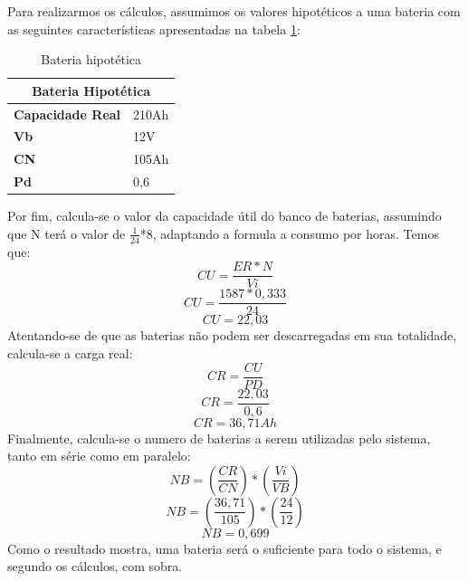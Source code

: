 Para realizarmos os cálculos, assumimos os valores hipotéticos a uma bateria com as seguintes características apresentadas na tabela \ref{cap:proposta:tab:bateria}:
\begin{table}[h]
\centering
\caption{Bateria hipotética}
\label{cap:proposta:tab:bateria}
\begin{tabular}{|l|l|}
\hline
\multicolumn{2}{|c|}{\textbf{Bateria Hipotética}} \\ \hline
\textbf{Capacidade Real}          & 210Ah         \\ \hline
\textbf{Vb}                       & 12V           \\ \hline
\textbf{CN}                       & 105Ah         \\ \hline
\textbf{Pd}                       & 0,6           \\ \hline
\end{tabular}
\end{table}

Por fim, calcula-se o valor da capacidade útil do banco de baterias, assumindo que N terá o valor de $\frac{1}{24}$*8, adaptando a formula a consumo por horas. Temos que:
\[CU=\frac{ER*N}{Vi}\]
\[CU=\frac{1587*0,333}{24}\]
\[CU=22,03\]
Atentando-se de que as baterias não podem ser descarregadas em sua totalidade, calcula-se a carga real:
\[CR=\frac{CU}{PD}\]
\[CR=\frac{22,03}{0,6}\]
\[CR=36,71Ah\]
Finalmente, calcula-se o numero de baterias a serem utilizadas pelo sistema, tanto em série como em paralelo:
\[NB=\left ( \frac{CR}{CN} \right )*\left ( \frac{Vi}{VB} \right )\]
\[NB=\left ( \frac{36,71}{105} \right )*\left ( \frac{24}{12} \right )\]
\[NB=0,699\]
Como o resultado mostra, uma bateria será o suficiente para todo o sistema, e segundo os cálculos, com sobra.

